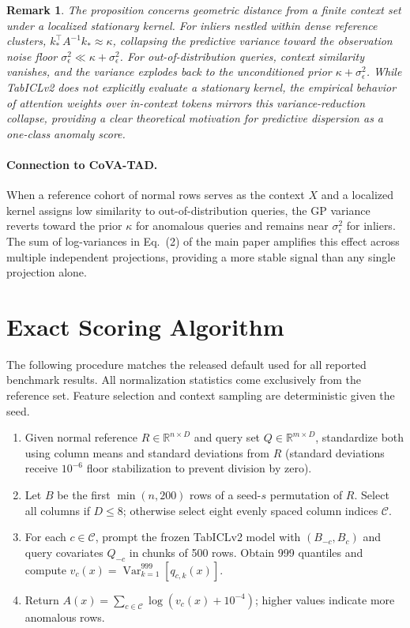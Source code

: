\documentclass{article}
\newtheorem{remark}{Remark}
\begin{document}
\begin{remark}
The proposition concerns geometric distance from a finite context set under a localized stationary kernel. For inliers nestled within dense reference clusters, $k_*^\top A^{-1} k_* \approx \kappa$, collapsing the predictive variance toward the observation noise floor $\sigma_\epsilon^2 \ll \kappa + \sigma_\epsilon^2$. For out-of-distribution queries, context similarity vanishes, and the variance explodes back to the unconditioned prior $\kappa + \sigma_\epsilon^2$. While TabICLv2 does not explicitly evaluate a stationary kernel, the empirical behavior of attention weights over in-context tokens mirrors this variance-reduction collapse, providing a clear theoretical motivation for predictive dispersion as a one-class anomaly score.
\end{remark}

\paragraph{Connection to CoVA-TAD.}
When a reference cohort of normal rows serves as the context $X$ and a localized kernel assigns low similarity to out-of-distribution queries, the GP variance reverts toward the prior $\kappa$ for anomalous queries and remains near $\sigma_\epsilon^2$ for inliers. The sum of log-variances in Eq.~(2) of the main paper amplifies this effect across multiple independent projections, providing a more stable signal than any single projection alone.

\section{Exact Scoring Algorithm}
\label{app:algorithm}

The following procedure matches the released default used for all reported benchmark results. All normalization statistics come exclusively from the reference set. Feature selection and context sampling are deterministic given the seed.

\begin{enumerate}
  \item Given normal reference $R \in \mathbb{R}^{n \times D}$ and query set $Q \in \mathbb{R}^{m \times D}$, standardize both using column means and standard deviations from $R$ (standard deviations receive $10^{-6}$ floor stabilization to prevent division by zero).
  \item Let $B$ be the first $\min(n, 200)$ rows of a seed-$s$ permutation of $R$. Select all columns if $D \leq 8$; otherwise select eight evenly spaced column indices $\mathcal{C}$.
  \item For each $c \in \mathcal{C}$, prompt the frozen TabICLv2 model with $(B_{-c}, B_c)$ and query covariates $Q_{-c}$ in chunks of 500 rows. Obtain 999 quantiles and compute $v_c(x) = \operatorname{Var}_{k=1}^{999}[q_{c,k}(x)]$.
  \item Return $A(x) = \sum_{c \in \mathcal{C}} \log(v_c(x) + 10^{-4})$; higher values indicate more anomalous rows.
\end{enumerate}
\end{document}
